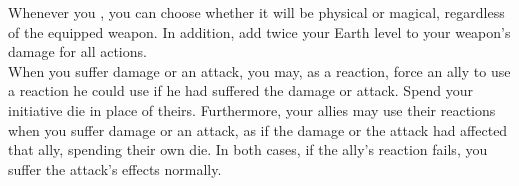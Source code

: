 \begin{tabjob}
         Whenever you , you can choose whether it will be physical or magical, regardless of the equipped weapon. In addition, add twice your Earth level to your weapon's damage for all actions. \\

         When you suffer damage or an attack, you may, as a reaction, force an ally to use a reaction he could use if he had suffered the damage or attack. Spend your initiative die in place of theirs. Furthermore, your allies may use their reactions when you suffer damage or an attack, as if the damage or the attack had affected that ally, spending their own die. In both cases, if the ally's reaction fails, you suffer the attack's effects normally. \\

\end{tabjob}